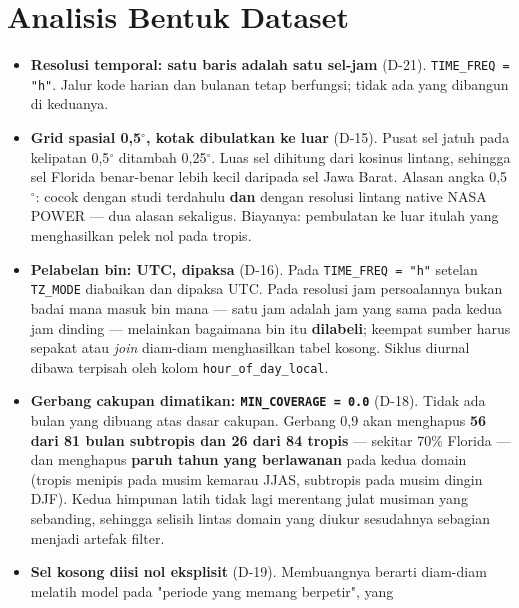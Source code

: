 \section{Analisis Bentuk Dataset}
\label{sec:bentuk-dataset}


\begin{itemize}
    \item \textbf{Resolusi temporal: satu baris adalah satu sel-jam} (D-21).
          \texttt{TIME\_FREQ = "h"}. Jalur kode harian dan bulanan tetap
          berfungsi; tidak ada yang dibangun di keduanya.
    \item \textbf{Grid spasial 0,5$^\circ$, kotak dibulatkan ke luar} (D-15).
          Pusat sel jatuh pada kelipatan 0,5$^\circ$ ditambah 0,25$^\circ$. Luas
          sel dihitung dari kosinus lintang, sehingga sel Florida benar-benar
          lebih kecil daripada sel Jawa Barat. Alasan angka 0,5$^\circ$: cocok
          dengan studi terdahulu \textbf{dan} dengan resolusi lintang native
          NASA POWER --- dua alasan sekaligus. Biayanya: pembulatan ke luar
          itulah yang menghasilkan pelek nol pada tropis.
    \item \textbf{Pelabelan bin: UTC, dipaksa} (D-16). Pada
          \texttt{TIME\_FREQ = "h"} setelan \texttt{TZ\_MODE} diabaikan dan
          dipaksa UTC. Pada resolusi jam persoalannya bukan badai mana masuk bin
          mana --- satu jam adalah jam yang sama pada kedua jam dinding ---
          melainkan bagaimana bin itu \textbf{dilabeli}; keempat sumber harus
          sepakat atau \textit{join} diam-diam menghasilkan tabel kosong. Siklus
          diurnal dibawa terpisah oleh kolom \texttt{hour\_of\_day\_local}.
    \item \textbf{Gerbang cakupan dimatikan: \texttt{MIN\_COVERAGE = 0.0}}
          (D-18). Tidak ada bulan yang dibuang atas dasar cakupan. Gerbang 0,9
          akan menghapus \textbf{56 dari 81 bulan subtropis dan 26 dari 84
          tropis} --- sekitar 70\% Florida --- dan menghapus \textbf{paruh tahun
          yang berlawanan} pada kedua domain (tropis menipis pada musim kemarau
          JJAS, subtropis pada musim dingin DJF). Kedua himpunan latih tidak lagi
          merentang julat musiman yang sebanding, sehingga selisih lintas domain
          yang diukur sesudahnya sebagian menjadi artefak filter.
    \item \textbf{Sel kosong diisi nol eksplisit} (D-19). Membuangnya berarti
          diam-diam melatih model pada "periode yang memang berpetir", yang

\end{itemize}
